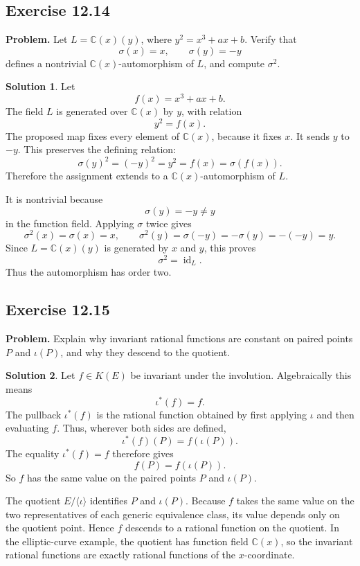 \documentclass[11pt]{article}
\theoremstyle{definition}
\newtheorem*{solution}{Solution}
\newcommand{\C}{\mathbb{C}}
\newcommand{\K}{K}
\begin{document}
\subsection*{Exercise 12.14}
\textbf{Problem.}  Let \(L=\C(x)(y)\), where \(y^2=x^3+ax+b\).  Verify that
\[
  \sigma(x)=x,\qquad \sigma(y)=-y
\]
defines a nontrivial \(\C(x)\)-automorphism of \(L\), and compute
\(\sigma^2\).

\begin{solution}
Let
\[
  f(x)=x^3+ax+b.
\]
The field \(L\) is generated over \(\C(x)\) by \(y\), with relation
\[
  y^2=f(x).
\]
The proposed map fixes every element of \(\C(x)\), because it fixes \(x\).
It sends \(y\) to \(-y\).  This preserves the defining relation:
\[
  \sigma(y)^2=(-y)^2=y^2=f(x)=\sigma(f(x)).
\]
Therefore the assignment extends to a \(\C(x)\)-automorphism of \(L\).

It is nontrivial because
\[
  \sigma(y)=-y\neq y
\]
in the function field.  Applying \(\sigma\) twice gives
\[
  \sigma^2(x)=\sigma(x)=x,
  \qquad
  \sigma^2(y)=\sigma(-y)=-\sigma(y)=-(-y)=y.
\]
Since \(L=\C(x)(y)\) is generated by \(x\) and \(y\), this proves
\[
  \sigma^2=\operatorname{id}_L.
\]
Thus the automorphism has order two.
\end{solution}

\subsection*{Exercise 12.15}
\textbf{Problem.}  Explain why invariant rational functions are constant on
paired points \(P\) and \(\iota(P)\), and why they descend to the quotient.

\begin{solution}
Let \(f\in\K(E)\) be invariant under the involution.  Algebraically this means
\[
  \iota^*(f)=f.
\]
The pullback \(\iota^*(f)\) is the rational function obtained by first applying
\(\iota\) and then evaluating \(f\).  Thus, wherever both sides are defined,
\[
  \iota^*(f)(P)=f(\iota(P)).
\]
The equality \(\iota^*(f)=f\) therefore gives
\[
  f(P)=f(\iota(P)).
\]
So \(f\) has the same value on the paired points \(P\) and \(\iota(P)\).

The quotient \(E/\langle\iota\rangle\) identifies \(P\) and \(\iota(P)\).
Because \(f\) takes the same value on the two representatives of each generic
equivalence class, its value depends only on the quotient point.  Hence \(f\)
descends to a rational function on the quotient.  In the elliptic-curve
example, the quotient has function field \(\C(x)\), so the invariant rational
functions are exactly rational functions of the \(x\)-coordinate.
\end{solution}
\end{document}
